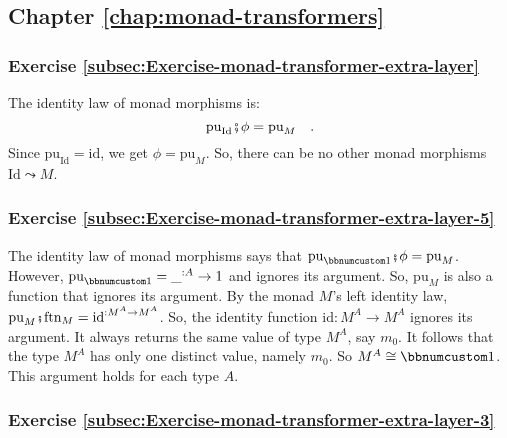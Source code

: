 \subsection*{Chapter \ref{chap:monad-transformers}}

\subsubsection*{Exercise \ref{subsec:Exercise-monad-transformer-extra-layer}}

The identity law of monad morphisms is:
\[
\text{pu}_{\text{Id}}\bef\phi=\text{pu}_{M}\quad.
\]
Since $\text{pu}_{\text{Id}}=\text{id}$, we get $\phi=\text{pu}_{M}$.
So, there can be no other monad morphisms $\text{Id}\leadsto M$.

\subsubsection*{Exercise \ref{subsec:Exercise-monad-transformer-extra-layer-5}}

The identity law of monad morphisms says that $\text{pu}_{\bbnum 1}\bef\phi=\text{pu}_{M}$.
However, $\text{pu}_{\bbnum 1}=\_^{:A}\rightarrow1$ and ignores its
argument. So, $\text{pu}_{M}$ is also a function that ignores its
argument. By the monad $M$\textsf{'}s left identity law, $\text{pu}_{M}\bef\text{ftn}_{M}=\text{id}^{:M^{A}\rightarrow M^{A}}$.
So, the identity function $\text{id}:M^{A}\rightarrow M^{A}$ ignores
its argument. It always returns the same value of type $M^{A}$, say
$m_{0}$. It follows that the type $M^{A}$ has only one distinct
value, namely $m_{0}$. So $M^{A}\cong\bbnum 1$. This argument holds
for each type $A$. 

\subsubsection*{Exercise \ref{subsec:Exercise-monad-transformer-extra-layer-3}}

